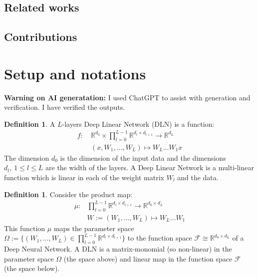 \documentclass{article}
\theoremstyle{definition}
\newtheorem{definition}[theorem]{Definition}
\begin{document}
\subsection{Related works}


\subsection{Contributions}


\section{Setup and notations}
\textbf{Warning on AI generatation:} I used ChatGPT to assist with generation and verification. I have verified the outputs. 
\begin{definition}
    A $L$-layers Deep Linear Network (DLN) is a function:
\begin{align*}
    f: \ & \mathbb{R}^{d_0} \times \prod_{l=0}^{L-1}\mathbb{R}^{d_l \times d_{l+1}}  \to \mathbb{R}^{d_L} \\
       & (x,W_1,...,W_L) \mapsto W_L...W_1 x
\end{align*}
The dimension $d_0$ is the dimension of the input data and the dimensions $d_l,\ 1\leq l \leq L$ are the width of the layers. A Deep Linear Network is a multi-linear function which is linear in each of the weight matrix $W_l$ and the data.
\end{definition}
\begin{definition}
    Consider the product map:
\begin{align*}
    \mu : & \prod_{l=0}^{L-1}\mathbb{R}^{d_l \times d_{l+1}} \to \mathbb{R}^{d_0\times d_L}\\
           &  W:=(W_1,...,W_L) \mapsto W_L...W_1
\end{align*}
This function $\mu$ maps the parameter space $\Omega:=\{(W_1,...,W_L) \in \prod_{l=0}^{L-1}\mathbb{R}^{d_l \times d_{l+1}}\}$ to the function space $\mathcal{F} \cong \mathbb{R}^{d_0\times d_L}$ of a Deep Neural Network. A DLN is a matrix-monomial (so non-linear) in the parameter space $\Omega$ (the space above) and linear map in the function space $\mathcal{F}$ (the space below).
\end{definition}
\end{document}

